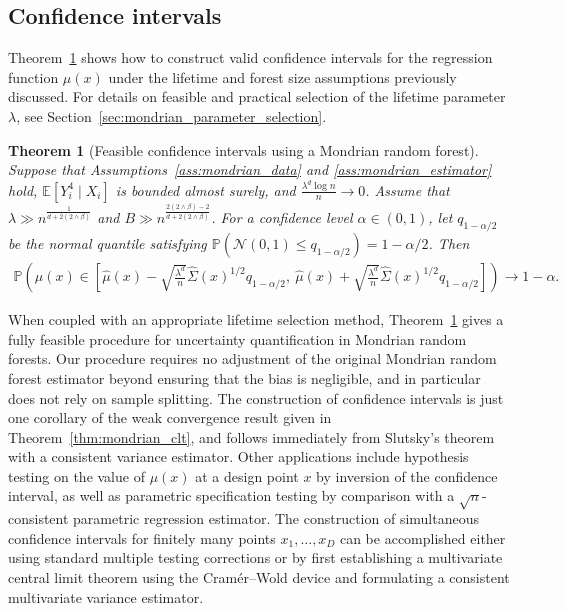 \documentclass[11pt,lof]{puthesis}
\renewcommand{\P}{\ensuremath{\mathbb{P}}}
\newcommand{\E}{\ensuremath{\mathbb{E}}}
\newcommand{\cN}{\ensuremath{\mathcal{N}}}
\theoremstyle{break}
\newtheorem{theorem}{Theorem}[section]
\theoremstyle{proof}
\begin{document}
\subsection{Confidence intervals}

Theorem~\ref{thm:mondrian_confidence} shows how to construct valid confidence
intervals
for the regression function $\mu(x)$ under the lifetime and forest size
assumptions previously discussed. For details on feasible and practical
selection of the lifetime parameter $\lambda$, see
Section~\ref{sec:mondrian_parameter_selection}.
%
\begin{theorem}[Feasible confidence intervals using a Mondrian random forest]%
\label{thm:mondrian_confidence}
%
Suppose that Assumptions~\ref{ass:mondrian_data} and
\ref{ass:mondrian_estimator} hold,
$\E[Y_i^4 \mid X_i ]$ is bounded almost surely,
and $\frac{\lambda^d \log n}{n} \to 0$. Assume that
$\lambda \gg n^{\frac{1}{d + 2(2 \wedge \beta)}}$
and $B \gg n^{\frac{2 (2 \wedge \beta) - 2}{d + 2 (2 \wedge \beta)}}$.
For a confidence level $\alpha \in (0, 1)$,
let $q_{1 - \alpha / 2}$ be the normal quantile satisfying
$\P \left( \cN(0, 1) \leq q_{1 - \alpha / 2} \right) = 1 - \alpha / 2$. Then
%
\begin{align*}
\P \left(
\mu(x) \in
\left[
\hat \mu(x)
- \sqrt{\frac{\lambda^d}{n}} \hat \Sigma(x)^{1/2}
q_{1 - \alpha / 2}, \
\hat \mu(x)
+ \sqrt{\frac{\lambda^d}{n}} \hat \Sigma(x)^{1/2}
q_{1 - \alpha / 2}
\right]
\right)
\to
1 - \alpha.
\end{align*}

\end{theorem}

When coupled with an appropriate lifetime selection method,
Theorem~\ref{thm:mondrian_confidence} gives a fully feasible procedure for
uncertainty
quantification in Mondrian random forests. Our procedure requires no adjustment
of the original Mondrian random forest estimator beyond ensuring that the bias
is negligible, and in particular does not rely on sample splitting. The
construction of confidence intervals is just one corollary of the weak
convergence result given in Theorem~\ref{thm:mondrian_clt}, and follows
immediately from Slutsky's theorem
\citep[Chapter~7]{pollard2002user}
with a consistent variance estimator. Other applications
include hypothesis testing on the value of $\mu(x)$ at a design point $x$ by
inversion of the confidence interval, as well as parametric specification
testing by comparison with a $\sqrt{n}$-consistent parametric regression
estimator. The construction of simultaneous confidence intervals for finitely
many points $x_1, \ldots, x_D$ can be accomplished either using standard
multiple testing corrections or by first establishing a multivariate central
limit theorem using the Cram{\'e}r--Wold device
\citep[Chapter~8]{pollard2002user}
and formulating a consistent multivariate variance estimator.
\end{document}

